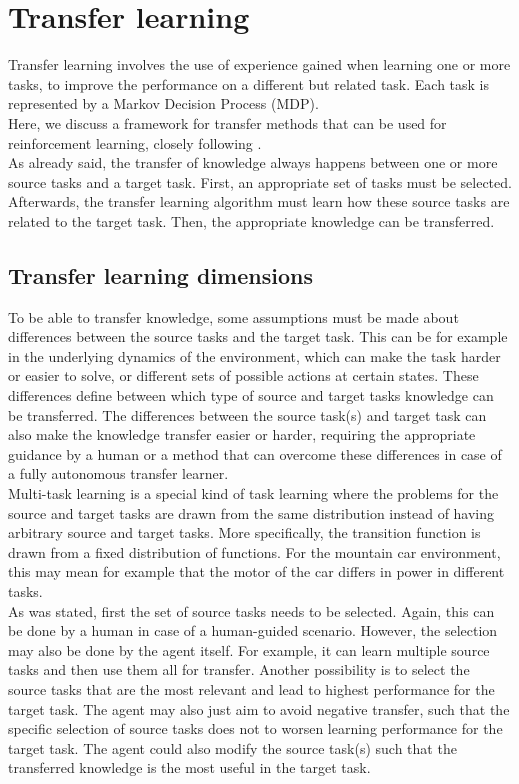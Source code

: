 \chapter{Transfer learning}
Transfer learning involves the use of experience gained when learning one or more tasks, to improve the performance on a different but related task. Each task is represented by a Markov Decision Process (MDP).\\  Here, we discuss a framework for transfer methods that can be used for reinforcement learning, closely following \cite{Taylor2009TransferSurvey}.\\

As already said, the transfer of knowledge always happens between one or more source tasks and a target task. First, an appropriate set of tasks must be selected. Afterwards, the transfer learning algorithm must learn how these source tasks are related to the target task. Then, the appropriate knowledge can be transferred.\\

\section{Transfer learning dimensions} %
\label{sub:transfer_learning_dimensions}
To be able to transfer knowledge, some assumptions must be made about differences between the source tasks and the target task. This can be for example in the underlying dynamics of the environment, which can make the task harder or easier to solve, or different sets of possible actions at certain states.
These differences define between which type of source and target tasks knowledge can be transferred. The differences between the source task(s) and target task can also make the knowledge transfer easier or harder, requiring the appropriate guidance by a human or a method that can overcome these differences in case of a fully autonomous transfer learner.\\
Multi-task learning is a special kind of task learning where the problems for the source and target tasks are drawn from the same distribution instead of having arbitrary source and target tasks. More specifically, the transition function is drawn from a fixed distribution of functions. For the mountain car environment, this may mean for example that the motor of the car differs in power in different tasks.\\

As was stated, first the set of source tasks needs to be selected. Again, this can be done by a human in case of a human-guided scenario. However, the selection may also be done by the agent itself. For example, it can learn multiple source tasks and then use them all for transfer.
Another possibility is to select the source tasks that are the most relevant and lead to highest performance for the target task. The agent may also just aim to avoid negative transfer, such that the specific selection of source tasks does not to worsen learning performance for the target task.
The agent could also modify the source task(s) such that the transferred knowledge is the most useful in the target task.\\

